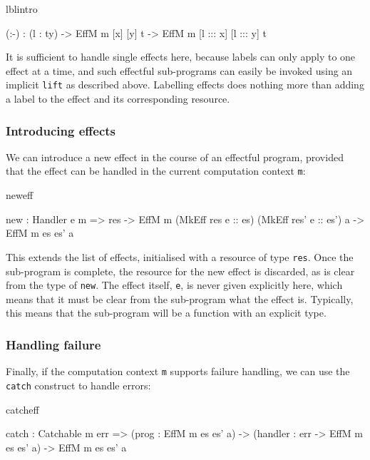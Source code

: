 \begin{SaveVerbatim}{lblintro}

(:-)  : (l : ty) -> 
        EffM m [x] [y] t -> 
        EffM m [l ::: x] [l ::: y] t

\end{SaveVerbatim}

\noindent
It is sufficient to handle single effects here, because labels can only
apply to one effect at a time, and such effectful sub-programs can easily
be invoked using an implicit \texttt{lift} as described above. Labelling
effects does nothing more than adding a label to the effect and its corresponding
resource.

\subsubsection{Introducing effects}

We can introduce a new effect in the course of an effectful program, provided
that the effect can be handled in the current computation context \texttt{m}:

\begin{SaveVerbatim}{neweff}

new : Handler e m => 
      res -> EffM m (MkEff res e :: es) 
                    (MkEff res' e :: es') a ->
      EffM m es es' a

\end{SaveVerbatim}

\noindent
This extends the list of effects, initialised with
a resource of type \texttt{res}.
Once the sub-program is complete, the resource for the new effect is discarded,
as is clear from the type of \texttt{new}.
%
The effect itself, \texttt{e}, is never given explicitly here, which
means that it must be clear from the sub-program what the effect is. Typically,
this means that the sub-program will be a function with an explicit type.

\subsubsection{Handling failure}

Finally, if the computation context \texttt{m} supports failure handling,
we can use the \texttt{catch} construct to handle errors:

\begin{SaveVerbatim}{catcheff}

catch : Catchable m err =>
        (prog : EffM m es es' a) -> 
        (handler : err -> EffM m es es' a) ->
        EffM m es es' a

\end{SaveVerbatim}

